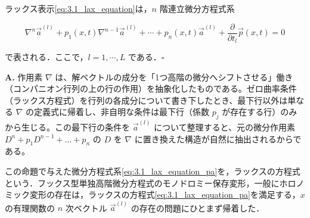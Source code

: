 \begin{proposition}
ラックス表示\eqref{eq:3.1_lax_equation}は，$n$ 階連立微分方程式系

\begin{equation}\label{eq:3.1_lax_equation_pa}
  \nabla^n \vec{a}^{(l)} + p_1(x,t)\nabla^{n-1}\vec{a}^{(l)} + \cdots + p_n(x,t)\vec{a}^{(l)} + \frac{\partial}{\partial t_l}\vec{p}(x,t) = 0
\end{equation}

で表される．ここで，$l=1,\cdots,L$ である．\hfill $\square$
\end{proposition}

\begin{Q}
\textbf{A.} 作用素 $\nabla$ は、解ベクトルの成分を「1つ高階の微分へシフトさせる」働き（コンパニオン行列の上の行の作用）を抽象化したものである。ゼロ曲率条件（ラックス方程式）を行列の各成分について書き下したとき、最下行以外は単なる $\nabla$ の定義式に帰着し、非自明な条件は最下行（係数 $p_j$ が存在する行）のみから生じる。この最下行の条件を $\vec{a}^{(l)}$ について整理すると、元の微分作用素 $D^n + p_1 D^{n-1} + \dots + p_n$ の $D$ を $\nabla$ に置き換えた構造が自然に抽出されるからである。
\end{Q}

この命題で与えた微分方程式系\eqref{eq:3.1_lax_equation_pa}を，ラックスの方程式という．フックス型単独高階微分方程式のモノドロミー保存変形，一般にホロノミック変形の存在は，ラックスの方程式\eqref{eq:3.1_lax_equation_pa}を満足する，$x$ の有理関数の $n$ 次ベクトル $\vec{a}^{(l)}$ の存在の問題にひとまず帰着した．


